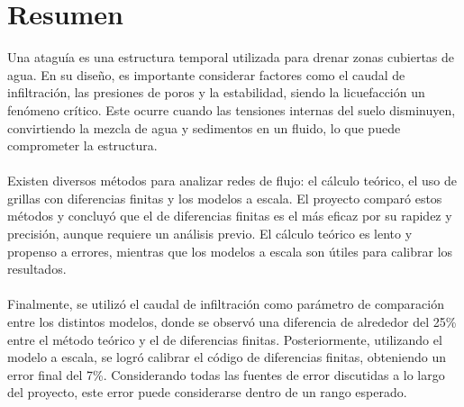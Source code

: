 \section*{Resumen}
Una ataguía es una estructura temporal utilizada para drenar zonas cubiertas de agua. En su diseño, es importante considerar factores como el caudal de infiltración, las presiones de poros y la estabilidad, siendo la licuefacción un fenómeno crítico. Este ocurre cuando las tensiones internas del suelo disminuyen, convirtiendo la mezcla de agua y sedimentos en un fluido, lo que puede comprometer la estructura.
\\ \\
Existen diversos métodos para analizar redes de flujo: el cálculo teórico, el uso de grillas con diferencias finitas y los modelos a escala. El proyecto comparó estos métodos y concluyó que el de diferencias finitas es el más eficaz por su rapidez y precisión, aunque requiere un análisis previo. El cálculo teórico es lento y propenso a errores, mientras que los modelos a escala son útiles para calibrar los resultados.
\\ \\
Finalmente, se utilizó el caudal de infiltración como parámetro de comparación entre los distintos modelos, donde se observó una diferencia de alrededor del 25\% entre el método teórico y el de diferencias finitas. Posteriormente, utilizando el modelo a escala, se logró calibrar el código de diferencias finitas, obteniendo un error final del 7\%. Considerando todas las fuentes de error discutidas a lo largo del proyecto, este error puede considerarse dentro de un rango esperado.
